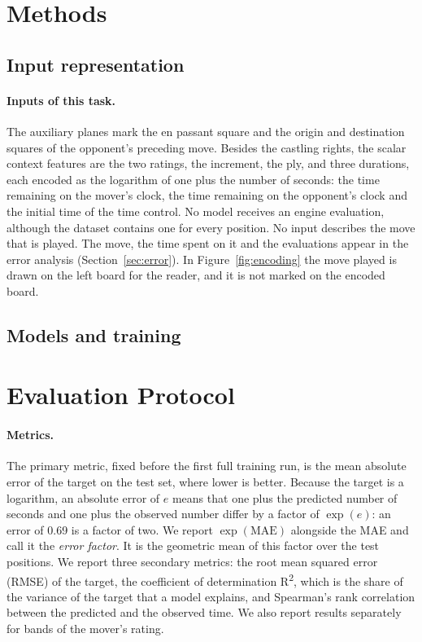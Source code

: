 \documentclass[11pt]{article}
\begin{document}
\section{Methods}
\label{sec:methods}

\subsection{Input representation}
\label{sec:input}



\paragraph{Inputs of this task.}
The auxiliary planes mark the en passant square and the origin and
destination squares of the opponent's preceding move. Besides the castling
rights, the scalar context features are the two ratings, the increment, the
ply, and three durations, each encoded as the logarithm of one plus the
number of seconds: the time remaining on the mover's clock, the time
remaining on the opponent's clock and the initial time of the time control. No model receives
an engine evaluation, although the dataset contains one for every position.
No input describes the move that is played. The move, the time spent on it
and the evaluations appear in the error analysis
(Section~\ref{sec:error}).\iflook{} In Figure~\ref{fig:encoding} the move
played is drawn on the left board for the reader, and it is not marked on the
encoded board.\fi

\subsection{Models and training}
\label{sec:models}



\section{Evaluation Protocol}
\label{sec:protocol}

\paragraph{Metrics.}
The primary metric, fixed before the first full training run, is the mean
absolute error of the target on the test set, where lower is better. Because
the target is a logarithm, an absolute error of $e$ means that one plus the
predicted number of seconds and one plus the observed number differ by a
factor of $\exp(e)$: an error of 0.69 is a factor of two. We report
$\exp(\mathrm{MAE})$ alongside the MAE and call it the \emph{error factor}.
It is the geometric mean of this factor over the test positions. We report
three secondary metrics: the root mean squared error (RMSE) of the target,
the coefficient of determination R\textsuperscript{2}, which is the share of
the variance of the target that a model explains, and Spearman's rank
correlation between the predicted and the observed time. We also report
results separately for  bands of the mover's rating.
\end{document}
